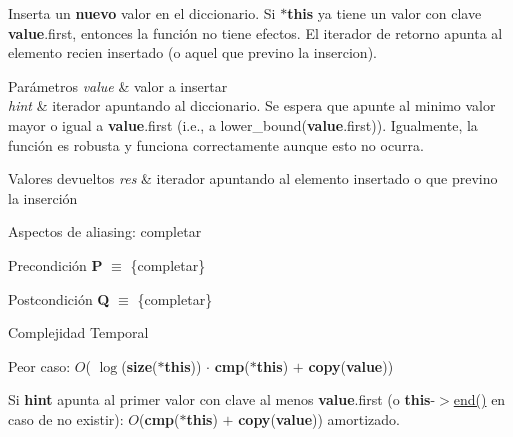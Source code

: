 Inserta un {\bfseries nuevo} valor en el diccionario. Si {\bfseries $\ast$this} ya tiene un valor con clave {\bfseries value}.first, entonces la función no tiene efectos. El iterador de retorno apunta al elemento recien insertado (o aquel que previno la insercion).


\begin{DoxyParams}{Parámetros}
{\em value} & valor a insertar \\
\hline
{\em hint} & iterador apuntando al diccionario. Se espera que apunte al minimo valor mayor o igual a {\bfseries value}.first (i.\+e., a lower\+\_\+bound({\bfseries value}.first)). Igualmente, la función es robusta y funciona correctamente aunque esto no ocurra. \\
\hline
\end{DoxyParams}

\begin{DoxyRetVals}{Valores devueltos}
{\em res} & iterador apuntando al elemento insertado o que previno la inserción\\
\hline
\end{DoxyRetVals}
\begin{DoxyParagraph}{Aspectos de aliasing\+:}
completar
\end{DoxyParagraph}
\begin{DoxyPrecond}{Precondición}
{\bfseries P} $\equiv$ \{completar\} 
\end{DoxyPrecond}
\begin{DoxyPostcond}{Postcondición}
{\bfseries Q} $\equiv$ \{completar\}
\end{DoxyPostcond}

\begin{DoxyDescription}
\item[Complejidad Temporal]
\begin{DoxyItemize}
\item Peor caso\+: $O$( $\log$({\bfseries size}({\bfseries $\ast$this})) $\cdot$ {\bfseries cmp}({\bfseries $\ast$this}) $+$ {\bfseries copy}({\bfseries value}))
\item Si {\bfseries hint} apunta al primer valor con clave al menos {\bfseries value}.first (o {\bfseries this}-\/$>$\hyperlink{classaed2_1_1map_a76023e6a56cb625513e1b5ea028bf983_a76023e6a56cb625513e1b5ea028bf983}{end()} en caso de no existir)\+: $O$({\bfseries cmp}({\bfseries $\ast$this}) $+$ {\bfseries copy}({\bfseries value})) amortizado. 
\end{DoxyItemize}
\end{DoxyDescription}

